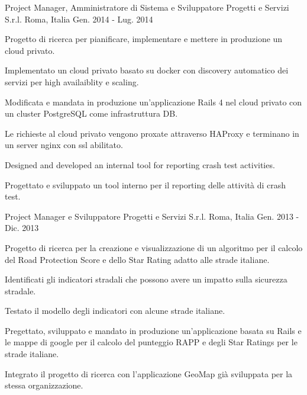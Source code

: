 \begin{cventries}
  \cventry
    {Project Manager, Amministratore di Sistema e Sviluppatore} %
    {Progetti e Servizi S.r.l.} %
    {Roma, Italia} %
    {Gen. 2014 - Lug. 2014} %
    {
      \begin{cvitems} %
        \item {Progetto di ricerca per pianificare, implementare e mettere in produzione un cloud privato.}
        \item {Implementato un cloud privato basato su docker con discovery automatico dei servizi per high availaiblity e scaling.}
        \item {Modificata e mandata in produzione un'applicazione Rails 4 nel cloud privato con un cluster PostgreSQL come infrastruttura DB.}
        \item {Le richieste al cloud privato vengono proxate attraverso HAProxy e terminano in un server nginx con ssl abilitato.}
        \item {Designed and developed an internal tool for reporting crash test activities.}
        \item {Progettato e sviluppato un tool interno per il reporting delle attività di crash test.}
          \begin{cvsubentries}
          \end{cvsubentries}
      \end{cvitems}
    }

  \cventry
    {Project Manager e Sviluppatore} %
    {Progetti e Servizi S.r.l.} %
    {Roma, Italia} %
    {Gen. 2013 - Dic. 2013} %
    {
      \begin{cvitems} %
        \item {Progetto di ricerca per la creazione e visualizzazione di un algoritmo per il calcolo del Road Protection Score e dello Star Rating adatto alle strade italiane.}
        \item {Identificati gli indicatori stradali che possono avere un impatto sulla sicurezza stradale.}
        \item {Testato il modello degli indicatori con alcune strade italiane.}
        \item {Pregettato, sviluppato e mandato in produzione un'applicazione basata su Rails e le mappe di google per il calcolo del punteggio RAPP e degli Star Ratings per le strade italiane.}
        \item {Integrato il progetto di ricerca con l'applicazione GeoMap già sviluppata per la stessa organizzazione.}
      \end{cvitems}
    }


\end{cventries}
